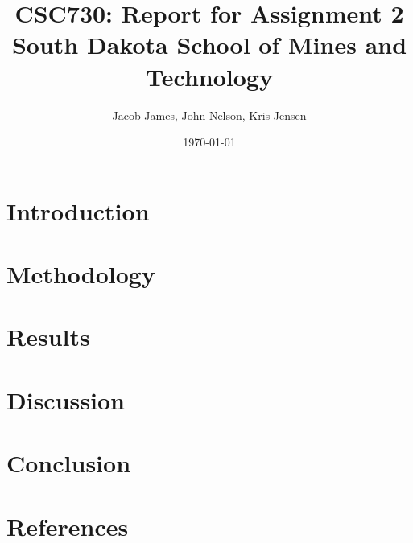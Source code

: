 \documentclass{article}
\begin{document}
\onecolumn %
\setlength{\droptitle}{-6em} 
\title{CSC730: Report for Assignment 2 \\ \large South Dakota School of Mines and Technology}
\author{Jacob James, John Nelson, Kris Jensen}

\date{\today}
\maketitle

\begin{multicols}{2} %
    \let\clearpage\relax
    \section{Introduction}
    

    \let\clearpage\relax
    \section{Methodology}
    

    \let\clearpage\relax
    \section{Results}
    

    \let\clearpage\relax
    \section{Discussion}
    

    \let\clearpage\relax
    \section{Conclusion}
    

    \let\clearpage\relax
    \section{References}
    

\end{multicols}
\end{document}
